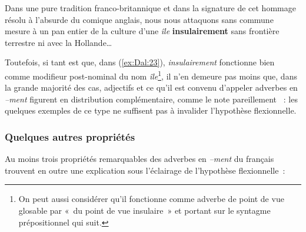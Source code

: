 \documentclass[output=paper]{langsci/langscibook}
\begin{document}
\ea \label{ex:Dal:23} Dans une pure tradition franco-britannique et dans la signature de cet hommage résolu à l'absurde du comique anglais, nous nous attaquons sans commune mesure à un pan entier de la culture d'une \emph{île} \textbf{insulairement} sans frontière terrestre ni avec la Hollande\ldots{}
\z

Toutefois, si tant est que, dans (\ref{ex:Dal:23}), \emph{insulairement} fonctionne bien comme modifieur post-nominal du nom \emph{île}\footnote{On peut aussi considérer qu'il fonctionne comme adverbe de point de vue glosable par «~du point de vue insulaire~» et portant sur le syntagme prépositionnel qui suit.}, il n'en demeure pas moins que, dans la grande majorité des cas, adjectifs et ce qu'il est convenu d'appeler adverbes en \emph{--ment} figurent en distribution complémentaire, comme le note pareillement %
\citet[356]{Giegerich12}%
%
~: les quelques exemples de ce type ne suffisent pas à invalider l'hypothèse flexionnelle.

\subsubsection{Quelques autres propriétés}

Au moins trois propriétés remarquables des adverbes en \emph{--ment} du français trouvent en outre une explication sous l'éclairage de l'hypothèse flexionnelle~:
\end{document}
